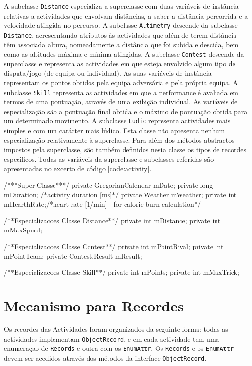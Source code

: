 \documentclass[a4paper,10pt]{report}
\begin{document}
A subclasse \verb!Distance! especializa a superclasse com duas variáveis de instância relativas a actividades que envolvam distâncias, a saber a 
distância percorrida e a velocidade atingida no percurso.
A subclasse \verb!Altimetry! descende da subclasse \verb!Distance!, acrescentando atributos às actividades que além de terem distância têm associada altura, 
nomeadamente a distância que foi subida e descida, bem como as altitudes máxima e mínima atingidas.
A subclasse \verb!Contest! descende da superclasse e representa as actividades em que esteja envolvido algum tipo de disputa/jogo (de equipa ou individual).
As suas variáveis de instância representam os pontos obtidos pela equipa adversária e pela própria equipa.
A subclasse \verb!Skill! representa as actividades em que a performance é avaliada em termos de uma pontuação, através de uma exibição individual.
As variáveis de especialização são a pontuação final obtida e o máximo de pontuação obtida para um determinado movimento.
A subclasse \verb!Ludic! representa actividades mais simples e com um carácter mais lúdico. Esta classe não apresenta nenhum especialização relativamente à 
superclasse. Para além dos métodos abstractos impostos pela superclasse, são também definidos nesta classe os tipos de recordes específicos.
Todas as variáveis da superclasse e subclasses referidas são apresentadas no excerto de código \ref{code:activity}.

\begin{code}[caption=Variáveis de instância da superclasse Activity e subclasses respectivas (src/model/activity)., label=code:activity]
/***Super Classe***/
private GregorianCalendar mDate;
private long mDuration; /*activity duration [ms]*/
private Weather mWeather;
private int mHearthRate;/*heart rate [1/min] - for calorie burn calculation*/

/**Especializacoes Classe Distance**/
private int mDistance;
private int mMaxSpeed;

/**Especializacoes Classe Contest**/
private int mPointRival;
private int mPointTeam;
private Contest.Result mResult;

/**Especializacoes Classe Skill**/
private int mPoints;
private int mMaxTrick;
\end{code}

\section{Mecanismo para Recordes}
\label{sec:record}
Os recordes das Actividades foram organizados da seguinte forma: todas as actividades implementam \verb!ObjectRecord!, e em cada actividade 
tem uma enumeração de \verb!Records! e outra com os \verb!EnumAttr!.
Os \verb!Records! e os \verb!EnumAttr! devem ser acedidos através dos métodos da interface \verb!ObjectRecord!.
\end{document}
